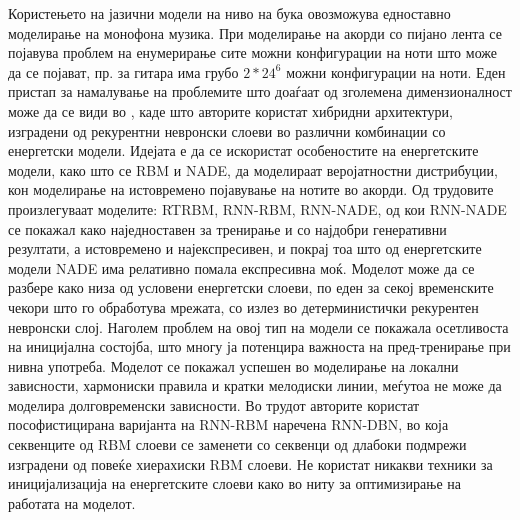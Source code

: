 Користењето на јазични модели на ниво на бука овозможува едноставно моделирање на монофона музика. При моделирање на акорди со пијано лента се појавува проблем на енумерирање сите можни конфигурации на ноти што може да се појават, пр. за гитара има грубо $2*24^6$ можни конфигурации на ноти. Еден пристап за намалување на проблемите што доаѓаат од зголемена димензионалност може да се види во \cite{Boulanger-Lewandowski2012, Boulanger-Lewandowski2014, Goel2014}, каде што авторите користат хибридни архитектури, изградени од рекурентни невронски слоеви во различни комбинации со енергетски модели. Идејата е да се искористат особеностите на енергетските модели, како што се RBM и NADE, да моделираат веројатностни дистрибуции, кон моделирање на истовремено појавување на нотите во акорди. Од трудовите \cite{Boulanger-Lewandowski2012, Boulanger-Lewandowski2014} произлегуваат моделите: RTRBM, RNN-RBM, RNN-NADE, од кои RNN-NADE се покажал како наједноставен за тренирање и со најдобри генеративни резултати, а истовремено и најекспресивен, и покрај тоа што од енергетските модели NADE има релативно помала експресивна моќ. Моделот може да се разбере како низа од условени енергетски слоеви, по еден за секој временските чекори што го обработува мрежата, со излез во детерминистички рекурентен невронски слој. Наголем проблем на овој тип на модели се покажала осетливоста на иницијална состојба, што многу ја потенцира важноста на пред-тренирање при нивна употреба. Моделот се покажал успешен во моделирање на локални зависности, хармониски правила и кратки мелодиски линии, меѓутоа не може да моделира долговременски зависности. Во трудот \cite{Goel2014} авторите користат пософистицирана варијанта на RNN-RBM наречена RNN-DBN, во која секвенците од RBM слоеви се заменети со секвенци од длабоки подмрежи изградени од повеќе хиерахиски RBM слоеви. Не користат никакви техники за иницијализација на енергетските слоеви како во \cite{Boulanger-Lewandowski2012, Boulanger-Lewandowski2014, Goel2014} ниту за оптимизирање на работата на моделот.

